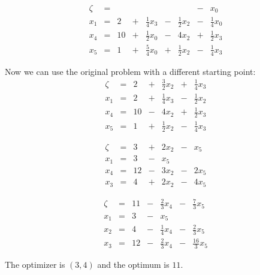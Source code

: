\documentclass[letterpaper,12pt]{article}
\theoremstyle{definition}
\begin{document}
\begin{equation*}
\begin{matrix}
\zeta &= & & & & & &- & x_0 \\
\hline
x_1 &=& 2 &+& \frac{1}{4} x_3 &-& \frac{1}{2} x_2 &-& \frac{1}{4}x_0 \\
x_4 &=& 10 &+& \frac{1}{2}x_0 &-&4x_2 &+&\frac{1}{2} x_3 \\
x_5 &=&1 &+& \frac{5}{4}x_0 &+& \frac{1}{2}x_2 &-& \frac{1}{4} x_3
\end{matrix}
\end{equation*}

Now we can use the original problem with a different starting point: 
\begin{equation*}
\begin{matrix}
\zeta &=&2 &+& \frac{3}{2} x_2 & +& \frac{1}{4}x_3 \\
\hline
x_1 &=& 2 &+& \frac{1}{4} x_3 &-& \frac{1}{2} x_2\\
x_4 &=& 10 &-&4x_2 &+&\frac{1}{2} x_3 \\
x_5 &=&1 &+& \frac{1}{2}x_2 &-& \frac{1}{4} x_3
\end{matrix}
\end{equation*}

\begin{equation*}
\begin{matrix}
\zeta &=&3 &+& 2x_2 &-& x_5 \\
\hline
x_1 &=& 3 &-&x_5 & &\\
x_4 &=& 12 &-&3x_2 &-&2x_5 \\
x_3 &=&4 &+& 2x_2 &-& 4x_5
\end{matrix}
\end{equation*}

\begin{equation*}
\begin{matrix}
\zeta &=&11&-& \frac{2}{3} x_4 &-& \frac{7}{3} x_5 \\
\hline
x_1 &=& 3 &-&x_5 & &\\
x_2 &=& 4 &-& \frac{1}{4} x_4 &-& \frac{2}{3} x_5 \\
x_3 &=& 12 &-& \frac{2}{3} x_4 &-& \frac{16}{3} x_5
\end{matrix}
\end{equation*}

The optimizer is $(3,4)$ and the optimum is $11$.
\end{document}
